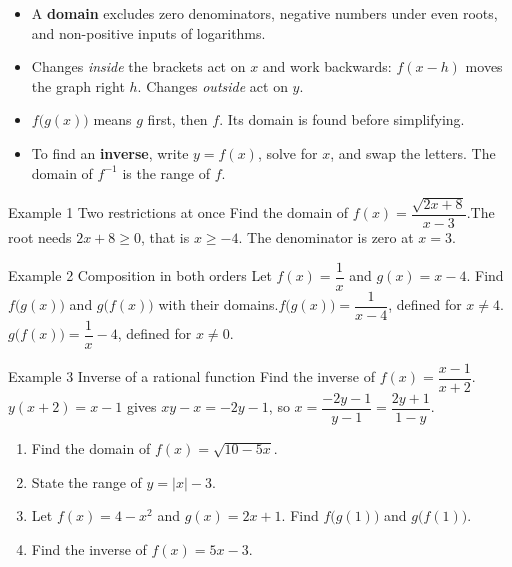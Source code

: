 \documentclass[11pt]{article}
\begin{document}

\begin{ideabox}
\begin{itemize}[leftmargin=*,itemsep=2pt,topsep=2pt]
  \item A \textbf{domain} excludes zero denominators, negative numbers under even roots, and non-positive inputs of logarithms.
  \item Changes \emph{inside} the brackets act on $x$ and work backwards: $f(x-h)$ moves the graph right $h$. Changes \emph{outside} act on $y$.
  \item $f\big(g(x)\big)$ means $g$ first, then $f$. Its domain is found before simplifying.
  \item To find an \textbf{inverse}, write $y=f(x)$, solve for $x$, and swap the letters. The domain of $f^{-1}$ is the range of $f$.
\end{itemize}
\end{ideabox}

\begin{example}{Example 1 \textperiodcentered{} Two restrictions at once}
Find the domain of $f(x)=\dfrac{\sqrt{2x+8}}{x-3}$.\soln The root needs $2x+8\ge0$, that is $x\ge-4$. The denominator is zero at $x=3$.
\end{example}

\begin{example}{Example 2 \textperiodcentered{} Composition in both orders}
Let $f(x)=\dfrac1x$ and $g(x)=x-4$. Find $f\big(g(x)\big)$ and $g\big(f(x)\big)$ with their domains.\soln $f\big(g(x)\big)=\dfrac{1}{x-4}$, defined for $x\neq4$. $g\big(f(x)\big)=\dfrac1x-4$, defined for $x\neq0$.
\end{example}

\begin{example}{Example 3 \textperiodcentered{} Inverse of a rational function}
Find the inverse of $f(x)=\dfrac{x-1}{x+2}$.\soln $y(x+2)=x-1$ gives $xy-x=-2y-1$, so $x=\dfrac{-2y-1}{y-1}=\dfrac{2y+1}{1-y}$.
\end{example}

\newpage
{}

\begin{enumerate}[leftmargin=*,itemsep=2pt]
  \item Find the domain of $f(x)=\sqrt{10-5x}$.\work{2.3cm}
  \item State the range of $y=|x|-3$.\work{2.3cm}
  \item Let $f(x)=4-x^2$ and $g(x)=2x+1$. Find $f\big(g(1)\big)$ and $g\big(f(1)\big)$.\work{2.3cm}
  \item Find the inverse of $f(x)=5x-3$.\work{2.3cm}
\end{enumerate}
\end{document}
